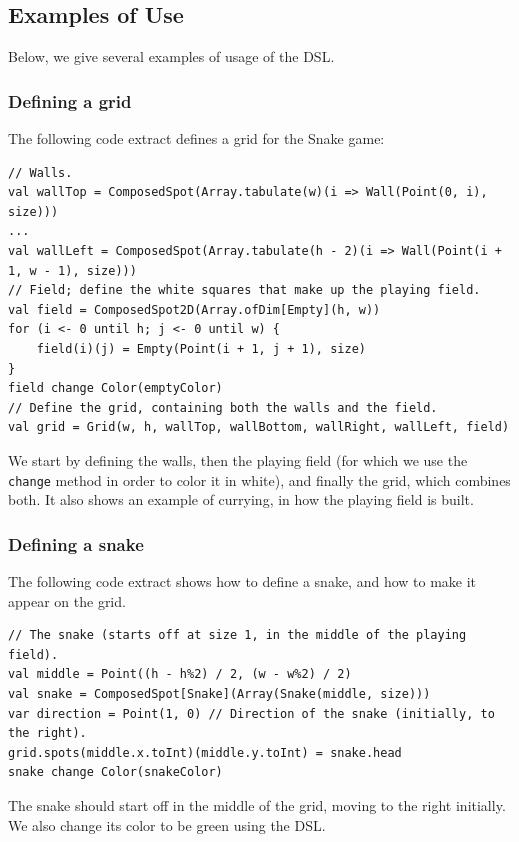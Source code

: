 \documentclass[journal,onecolumn, 9pt]{IEEEtran}
\theoremstyle{definition}
\newcommand{\scala}[1]{\texttt{#1}}
\begin{document}
\subsection{Examples of Use}
Below, we give several examples of usage of the DSL.

\subsubsection{Defining a grid}
The following code extract defines a grid for the Snake game:
\begin{verbatim}
// Walls.
val wallTop = ComposedSpot(Array.tabulate(w)(i => Wall(Point(0, i), size)))
...
val wallLeft = ComposedSpot(Array.tabulate(h - 2)(i => Wall(Point(i + 1, w - 1), size)))
// Field; define the white squares that make up the playing field.
val field = ComposedSpot2D(Array.ofDim[Empty](h, w))
for (i <- 0 until h; j <- 0 until w) {
	field(i)(j) = Empty(Point(i + 1, j + 1), size)
}
field change Color(emptyColor)
// Define the grid, containing both the walls and the field.
val grid = Grid(w, h, wallTop, wallBottom, wallRight, wallLeft, field)
\end{verbatim}
We start by defining the walls, then the playing field (for which we use the \scala{change} method in order to color it in white), and finally the grid, which combines both.
It also shows an example of currying, in how the playing field is built.

\subsubsection{Defining a snake}
The following code extract shows how to define a snake, and how to make it appear on the grid.
\begin{verbatim}
// The snake (starts off at size 1, in the middle of the playing field).
val middle = Point((h - h%2) / 2, (w - w%2) / 2)
val snake = ComposedSpot[Snake](Array(Snake(middle, size)))
var direction = Point(1, 0) // Direction of the snake (initially, to the right).
grid.spots(middle.x.toInt)(middle.y.toInt) = snake.head
snake change Color(snakeColor)
\end{verbatim}
The snake should start off in the middle of the grid, moving to the right initially.
We also change its color to be green using the DSL.
\end{document}
